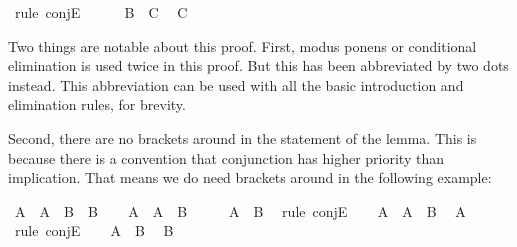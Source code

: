 \begin{isabellebody}
\ {\isacharparenleft}rule\ conjE{\isacharparenright}\isanewline
\ \ \ \ \isamarkupfalse%
\ {\isacharbackquoteopen}B\ {\isasymlongrightarrow}\ C{\isacharbackquoteclose}\ \isamarkupfalse%
\ {\isachardoublequoteopen}C{\isachardoublequoteclose}\isacommand{{\isachardot}{\isachardot}}\isamarkupfalse%
\isanewline
\ \ \isamarkupfalse%
\isanewline
{}\isamarkupfalse%
%
\endisatagproof
{\isafoldproof}%
%
\isadelimproof
%
\endisadelimproof
%
\begin{isamarkuptext}%
Two things are notable about this proof. First, modus ponens or conditional elimination is
used twice in this proof. But this has been abbreviated by two dots instead. This abbreviation can
be used with all the basic introduction and elimination rules, for brevity.%
\end{isamarkuptext}\isamarkuptrue%
%
\begin{isamarkuptext}%
Second, there are no brackets around  in the statement of the lemma. This is
because there is a convention that conjunction has higher priority than implication. That means we
do need brackets around  in the following example:%
\end{isamarkuptext}\isamarkuptrue%
\isamarkupfalse%
\ {\isachardoublequoteopen}A\ {\isasymand}\ {\isacharparenleft}A\ {\isasymlongrightarrow}\ B{\isacharparenright}\ {\isasymlongrightarrow}\ B{\isachardoublequoteclose}\isanewline
%
\isadelimproof
%
\endisadelimproof
%
\isatagproof
{}\isamarkupfalse%
\isanewline
\ \ \isamarkupfalse%
\ {\isachardoublequoteopen}A\ {\isasymand}\ {\isacharparenleft}A\ {\isasymlongrightarrow}\ B{\isacharparenright}{\isachardoublequoteclose}\isanewline
\ \ \isamarkupfalse%
\ \isamarkupfalse%
\ {\isachardoublequoteopen}A\ {\isasymlongrightarrow}\ B{\isachardoublequoteclose}\ \isamarkupfalse%
\ {\isacharparenleft}rule\ conjE{\isacharparenright}\isanewline
\ \ \isamarkupfalse%
\ {\isacharbackquoteopen}A\ {\isasymand}\ {\isacharparenleft}A\ {\isasymlongrightarrow}\ B{\isacharparenright}{\isacharbackquoteclose}\ \isamarkupfalse%
\ {\isachardoublequoteopen}A{\isachardoublequoteclose}\ \isamarkupfalse%
\ {\isacharparenleft}rule\ conjE{\isacharparenright}\isanewline
\ \ \isamarkupfalse%
\ {\isacharbackquoteopen}A\ {\isasymlongrightarrow}\ B{\isacharbackquoteclose}\ \isamarkupfalse%
\ {\isachardoublequoteopen}B{\isachardoublequoteclose}\isacommand{{\isachardot}{\isachardot}}\isamarkupfalse%

\end{isabellebody}

